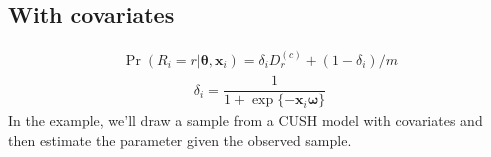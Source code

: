 \documentclass[letterpaper,10pt,english]{sphinxmanual}
\begin{document}
\subsection{With covariates}
\label{\detokenize{manual:id117}}\begin{equation*}
\begin{split}\Pr(R_i=r|\pmb\theta,\pmb x_i) = \delta_i D_r^{(c)} + (1-\delta_i)/m\end{split}
\end{equation*}\begin{equation*}
\begin{split}\delta_i = \dfrac{1}{1+\exp\{ - \pmb x_i \pmb\omega \}}\end{split}
\end{equation*}
\sphinxAtStartPar
In the example, we’ll draw a sample from a CUSH model with covariates and
then estimate the parameter given the observed sample.
\end{document}
